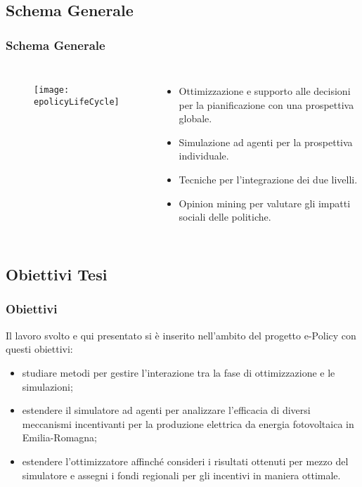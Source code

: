\documentclass{beamer}
\begin{document}
\subsection{Schema Generale}
	\begin{frame}
		\frametitle{Schema Generale}
		\begin{columns}
			\begin{figure}[hbt]
				\centering
				\texttt{[image: epolicyLifeCycle]}
				\label{epolicyLifeCycle}
			\end{figure}
		\begin{itemize}
			\item Ottimizzazione e supporto alle decisioni per la pianificazione con una prospettiva globale.
			\item Simulazione ad agenti per la prospettiva individuale.
			\item Tecniche per l'integrazione dei due livelli.
			\item Opinion mining per valutare gli impatti sociali delle politiche.
		\end{itemize}
		\end{columns}
	\end{frame}
	
\subsection{Obiettivi Tesi}
	\begin{frame}
		\frametitle{Obiettivi}
		Il lavoro svolto e qui presentato si è inserito nell'ambito del progetto e-Policy con questi obiettivi:
		\begin{itemize}
			\item[\checkmark] studiare metodi per gestire l'interazione tra la fase di ottimizzazione e le simulazioni;
			\item[\checkmark] estendere il simulatore ad agenti per analizzare l'efficacia di diversi meccanismi incentivanti per la produzione elettrica da energia fotovoltaica in Emilia-Romagna;
			\item[\checkmark] estendere l'ottimizzatore affinché consideri i risultati ottenuti per mezzo del simulatore e assegni i fondi regionali per gli incentivi in maniera ottimale.
		\end{itemize}	
	\end{frame}
  
  
\end{document}
